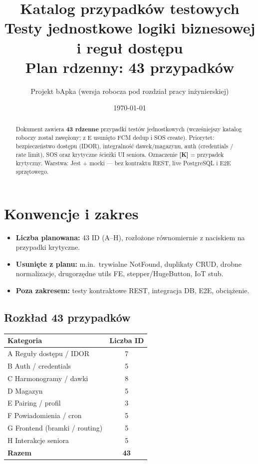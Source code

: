 \documentclass[11pt,a4paper]{article}
\title{Katalog przypadków testowych\\[0.4em]
\large Testy jednostkowe logiki biznesowej i reguł dostępu\\[0.3em]
\normalsize Plan rdzenny: 43 przypadków}
\author{Projekt bApka (wersja robocza pod rozdział pracy inżynierskiej)}
\date{\today}
\newcommand{\kryt}{\textcolor{red!70!black}{\textbf{[K]}}}
\begin{document}
\maketitle

\begin{abstract}
\noindent
Dokument zawiera \textbf{43 rdzenne} przypadki testów jednostkowych
(wcześniejszy katalog roboczy został zawężony; z E usunięto FCM dedup i SOS create).
Priorytet: bezpieczeństwo dostępu (IDOR), integralność dawek/magazynu,
auth (credentials / rate limit), SOS oraz krytyczne ścieżki UI seniora.
Oznaczenie \kryt{} = przypadek krytyczny.
Warstwa: Jest + mocki --- bez kontraktu REST, live PostgreSQL i E2E sprzętowego.
\end{abstract}

\tableofcontents
\newpage

\section{Konwencje i zakres}

\begin{itemize}[leftmargin=*]
  \item \textbf{Liczba planowana:} 43 ID (A--H), rozłożone równomiernie z naciskiem
        na przypadki krytyczne.
  \item \textbf{Usunięte z planu:} m.in.\ trywialne NotFound, duplikaty CRUD,
        drobne normalizacje, drugorzędne utils FE, stepper/HugeButton, IoT stub.
  \item \textbf{Poza zakresem:} testy kontraktowe REST, integracja DB, E2E, obciążenie.
\end{itemize}

\subsection*{Rozkład 43 przypadków}
\begin{center}
\begin{tabular}{@{}lc@{}}
\toprule
Kategoria & Liczba ID \\
\midrule
A Reguły dostępu / IDOR & 7 \\
B Auth / credentials & 5 \\
C Harmonogramy / dawki & 8 \\
D Magazyn & 5 \\
E Pairing / profil & 3 \\
F Powiadomienia / cron & 5 \\
G Frontend (bramki / routing) & 5 \\
H Interakcje seniora & 5 \\
\midrule
\textbf{Razem} & \textbf{43} \\
\bottomrule
\end{tabular}
\end{center}
\end{document}
